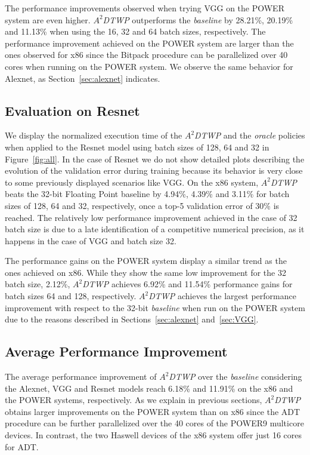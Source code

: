 The performance improvements observed when trying VGG on the POWER system are even higher.
\textit{$A^2$DTWP} outperforms the \textit{baseline} by 28.21\%, 20.19\% and 11.13\% when using the 16, 32 and 64 batch sizes, respectively.
The performance improvement achieved on the POWER system are larger than the ones observed for x86 since the Bitpack procedure can be parallelized over 40 cores when running on the POWER system.
We observe the same behavior for Alexnet, as Section~\ref{sec:alexnet} indicates.

\subsection{Evaluation on Resnet}
\label{sec:Resnet}
We display the normalized execution time of the \textit{$A^2$DTWP} and the \textit{oracle} policies when applied to the Resnet model using batch sizes of 128, 64 and 32 in Figure~\ref{fig:all}.
In the case of Resnet we do not show detailed plots describing the evolution of 
the validation error during training because its behavior is very close to some previously displayed scenarios like VGG.
On the x86 system, \textit{$A^2$DTWP} beats the 32-bit Floating Point baseline by 4.94\%, 4.39\% and 3.11\% for batch sizes of 128, 64 and 32, respectively, once a top-5 validation error of 30\% is reached.
The relatively low performance improvement achieved in the case of 32 batch size is due to a late identification of a competitive numerical precision, as it happens in the case of VGG and batch size 32.

The performance gains on the POWER system display a similar trend as the ones achieved on x86. 
While they show the same low improvement for the 32 batch size, 2.12\%, \textit{$A^2$DTWP} achieves 6.92\% and 11.54\% performance gains for batch sizes 64 and 128, respectively.
\textit{$A^2$DTWP} achieves the largest performance improvement with respect to the 32-bit \textit{baseline} when run on the POWER system due to the reasons described in Sections~\ref{sec:alexnet} and~\ref{sec:VGG}.

\subsection{Average Performance Improvement}
\label{sec:Average}
The average performance improvement of \textit{$A^2$DTWP} over the 
\textit{baseline} considering the Alexnet, VGG and Resnet models reach 6.18\% and 11.91\% on the x86 and the POWER systems, respectively. 
As we explain in previous sections, \textit{$A^2$DTWP} obtains larger improvements on the POWER system than on  
x86 since the ADT procedure can be further parallelized over the 40 cores of the POWER9 multicore devices.
In contrast, the two Haswell devices of the x86 system offer just 16 cores for ADT.

